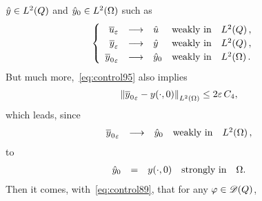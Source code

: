 $\hat{y}\in L^{2}\!\left({Q}\right)$ and ${\hat{y}}_{0}\in L^{2}\!\left({\Omega}\right)$ such as
\begin{equation*}
    \begin{cases}\displaystyle
        \begin{array}{rclll}
            {\overline{u}}_{\varepsilon} & \longrightarrow & \hat{u} & \text{weakly in} &
            L^{2}\!\left({Q}\right),\\
            {\overline{y}}_{\varepsilon} & \longrightarrow & \hat{y} & \text{weakly in} &
            L^{2}\!\left({Q}\right),\\
            {\overline{y}_{0}}_{\varepsilon} & \longrightarrow & {\hat{y}}_{0} &
            \text{weakly in} & L^{2}\!\left({\Omega}\right).
        \end{array}
    \end{cases}
\end{equation*}
But much more,~\eqref{eq:control95} also implies
\begin{equation}\label{eq:control106}
    {\left\|{{\overline{y}_{0}}_{\varepsilon} -  {y}\!\left({\cdot, 0}\right)  }\right\|}_{L^{2}\left({\Omega}\right)} \leq 2\varepsilon\,C_{4},
\end{equation}
which leads, since
\begin{equation}\label{eq:control106p}
    \begin{array}{rclll}
        {\overline{y}_{0}}_{\varepsilon} & \longrightarrow & {\hat{y}}_{0} &
        \text{weakly in} & L^{2}\!\left({\Omega}\right),
    \end{array}
\end{equation}
to
\begin{equation}\label{eq:control107}
    \begin{array}{rclll}
        {\hat{y}}_{0} & = & {y}\!\left({\cdot, 0}\right) & \text{strongly in} & \Omega.
    \end{array}
\end{equation}
Then it comes, with~\eqref{eq:control89}, that for any $\varphi\in\mathscr{D}(Q)$,
